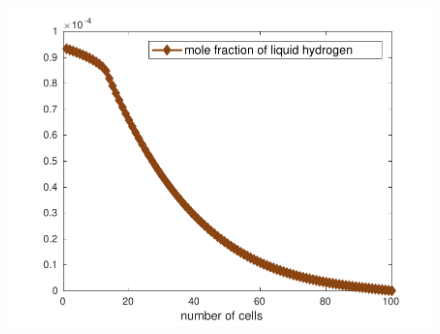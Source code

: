 \documentclass[10 pt]{beamer}
\begin{document}
\begin{frame}
\begin{figure}
\begin{minipage}[c]{.33\linewidth}
\includegraphics[width=\textwidth]{image/image_mole_fraction_modif}     
\end{minipage}
\end{figure}
\end{frame}
\end{document}
